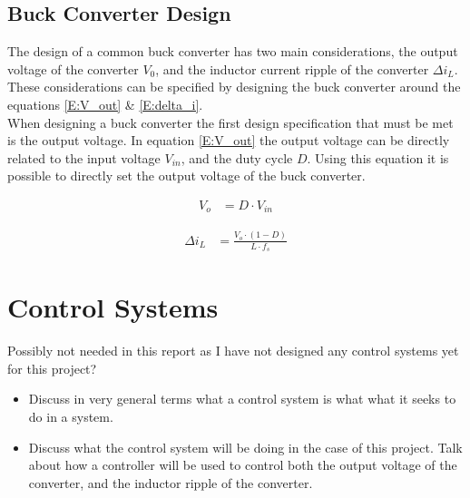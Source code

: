 \subsection{Buck Converter Design}

The design of a common buck converter has two main considerations, the output voltage of the converter $V_0$, and the inductor current ripple of the converter $\Delta i_L$. These considerations can be specified by designing the buck converter around the equations \ref{E:V_out} \& \ref{E:delta_i}.\\ 

When designing a buck converter the first design specification that must be met is the output voltage. In equation \ref{E:V_out} the output voltage can be directly related to the input voltage $V_{in}$, and the duty cycle $D$. Using this equation it is possible to directly set the output voltage of the buck converter. 


\begin{align}\label{E:V_out}
      V_o &= D \cdot V_{in}
\end{align}

\begin{align}\label{E:delta_i}
   \Delta i_L &= \frac{ V_{o} \cdot \left( 1 - D \right) } {L \cdot f_s}
\end{align}


\section{Control Systems}\label{S:control}

Possibly not needed in this report as I have not designed any control systems yet for this project?

\begin{itemize}

    \item
          Discuss in very general terms what a control system is what what it seeks to do in a system.

    \item
          Discuss what the control system will be doing in the case of this project. Talk about how a controller will be used to control both the output voltage of the converter, and the inductor ripple of the converter.

\end{itemize}